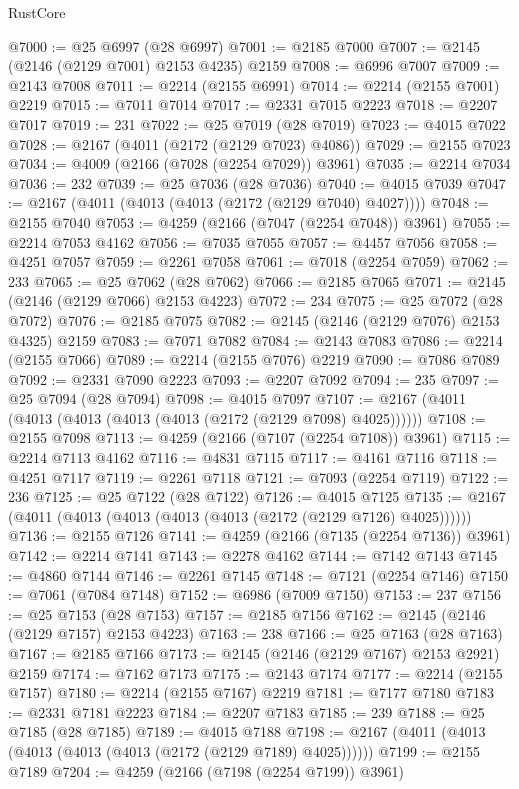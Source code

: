 \begin{lexlean}{RustCore}
\begin{coremodule}
@7000 := @25 @6997 (@28 @6997)
@7001 := @2185 @7000
@7007 := @2145 (@2146 (@2129 @7001) @2153 @4235) @2159
@7008 := @6996 @7007
@7009 := @2143 @7008
@7011 := @2214 (@2155 @6991)
@7014 := @2214 (@2155 @7001) @2219
@7015 := @7011 @7014
@7017 := @2331 @7015 @2223
@7018 := @2207 @7017
@7019 := 231
@7022 := @25 @7019 (@28 @7019)
@7023 := @4015 @7022
@7028 := @2167 (@4011 (@2172 (@2129 @7023) @4086))
@7029 := @2155 @7023
@7034 := @4009 (@2166 (@7028 (@2254 @7029)) @3961)
@7035 := @2214 @7034
@7036 := 232
@7039 := @25 @7036 (@28 @7036)
@7040 := @4015 @7039
@7047 := @2167 (@4011 (@4013 (@4013 (@2172 (@2129 @7040) @4027))))
@7048 := @2155 @7040
@7053 := @4259 (@2166 (@7047 (@2254 @7048)) @3961)
@7055 := @2214 @7053 @4162
@7056 := @7035 @7055
@7057 := @4457 @7056
@7058 := @4251 @7057
@7059 := @2261 @7058
@7061 := @7018 (@2254 @7059)
@7062 := 233
@7065 := @25 @7062 (@28 @7062)
@7066 := @2185 @7065
@7071 := @2145 (@2146 (@2129 @7066) @2153 @4223)
@7072 := 234
@7075 := @25 @7072 (@28 @7072)
@7076 := @2185 @7075
@7082 := @2145 (@2146 (@2129 @7076) @2153 @4325) @2159
@7083 := @7071 @7082
@7084 := @2143 @7083
@7086 := @2214 (@2155 @7066)
@7089 := @2214 (@2155 @7076) @2219
@7090 := @7086 @7089
@7092 := @2331 @7090 @2223
@7093 := @2207 @7092
@7094 := 235
@7097 := @25 @7094 (@28 @7094)
@7098 := @4015 @7097
@7107 := @2167 (@4011 (@4013 (@4013 (@4013 (@4013 (@2172 (@2129 @7098) @4025))))))
@7108 := @2155 @7098
@7113 := @4259 (@2166 (@7107 (@2254 @7108)) @3961)
@7115 := @2214 @7113 @4162
@7116 := @4831 @7115
@7117 := @4161 @7116
@7118 := @4251 @7117
@7119 := @2261 @7118
@7121 := @7093 (@2254 @7119)
@7122 := 236
@7125 := @25 @7122 (@28 @7122)
@7126 := @4015 @7125
@7135 := @2167 (@4011 (@4013 (@4013 (@4013 (@4013 (@2172 (@2129 @7126) @4025))))))
@7136 := @2155 @7126
@7141 := @4259 (@2166 (@7135 (@2254 @7136)) @3961)
@7142 := @2214 @7141
@7143 := @2278 @4162
@7144 := @7142 @7143
@7145 := @4860 @7144
@7146 := @2261 @7145
@7148 := @7121 (@2254 @7146)
@7150 := @7061 (@7084 @7148)
@7152 := @6986 (@7009 @7150)
@7153 := 237
@7156 := @25 @7153 (@28 @7153)
@7157 := @2185 @7156
@7162 := @2145 (@2146 (@2129 @7157) @2153 @4223)
@7163 := 238
@7166 := @25 @7163 (@28 @7163)
@7167 := @2185 @7166
@7173 := @2145 (@2146 (@2129 @7167) @2153 @2921) @2159
@7174 := @7162 @7173
@7175 := @2143 @7174
@7177 := @2214 (@2155 @7157)
@7180 := @2214 (@2155 @7167) @2219
@7181 := @7177 @7180
@7183 := @2331 @7181 @2223
@7184 := @2207 @7183
@7185 := 239
@7188 := @25 @7185 (@28 @7185)
@7189 := @4015 @7188
@7198 := @2167 (@4011 (@4013 (@4013 (@4013 (@4013 (@2172 (@2129 @7189) @4025))))))
@7199 := @2155 @7189
@7204 := @4259 (@2166 (@7198 (@2254 @7199)) @3961)

\end{coremodule}
\end{lexlean}
